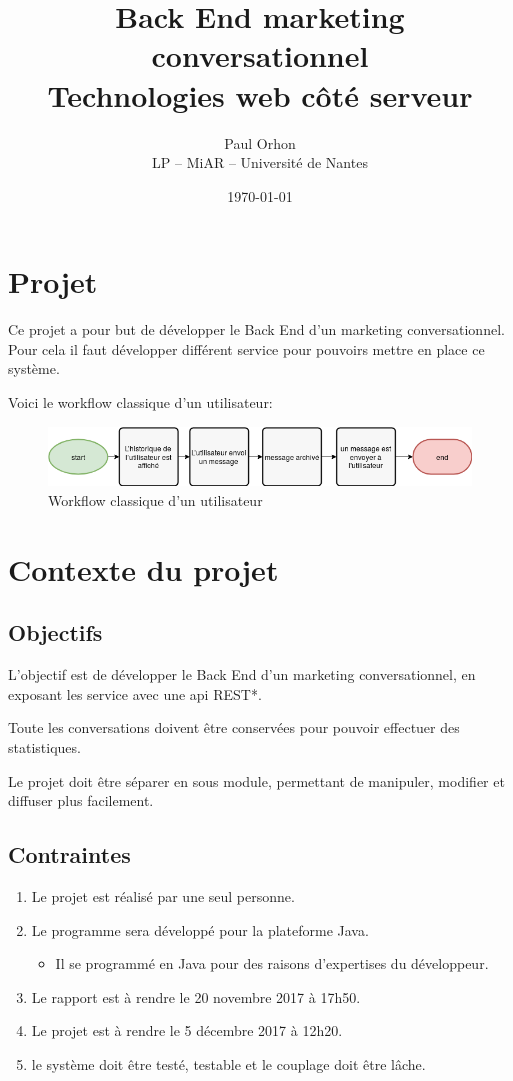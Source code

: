 \documentclass{article}
\title{Back End marketing conversationnel\\
    \normalsize Technologies web côté serveur}
\date{\today}
\author{Paul Orhon\\
\small LP -- MiAR -- Université de Nantes }
\begin{document}
\maketitle%
\tableofcontents


\listoffigures


\clearpage

\section{Projet}
Ce projet a pour but de développer le Back End d’un marketing conversationnel.
Pour cela il faut développer différent service pour pouvoirs mettre en place ce système.

Voici le workflow classique d'un utilisateur:\\
\begin{figure}[h]
    \centering
    \includegraphics[width=\linewidth]{img/workflow_user.png}
    \caption{Workflow classique d'un utilisateur}
\end{figure}



\section{Contexte du projet}
\subsection{Objectifs}
L’objectif est de développer le Back End d’un marketing conversationnel, en exposant les service avec une api \acrshort{REST}*.

Toute les conversations doivent être conservées pour pouvoir effectuer des statistiques.

Le projet doit être séparer en sous module, permettant de manipuler, modifier et diffuser plus facilement.


\subsection{Contraintes}
\begin{enumerate}
    \item Le projet est réalisé par une seul personne.
    \item Le programme sera développé pour la plateforme Java.
    \begin{itemize}
        \item Il se programmé en Java pour des raisons d’expertises du développeur. 
    \end{itemize}
    \item Le rapport est à rendre le 20 novembre 2017 à 17h50.
    \item Le projet est à rendre le 5 décembre 2017 à 12h20.
    \item le système doit être testé, testable et le couplage doit être lâche.
\end{enumerate}
\end{document}

